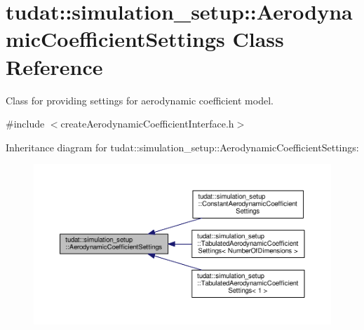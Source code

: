 \hypertarget{classtudat_1_1simulation__setup_1_1AerodynamicCoefficientSettings}{}\section{tudat\+:\+:simulation\+\_\+setup\+:\+:Aerodynamic\+Coefficient\+Settings Class Reference}
\label{classtudat_1_1simulation__setup_1_1AerodynamicCoefficientSettings}


Class for providing settings for aerodynamic coefficient model.  




{\ttfamily \#include $<$create\+Aerodynamic\+Coefficient\+Interface.\+h$>$}



Inheritance diagram for tudat\+:\+:simulation\+\_\+setup\+:\+:Aerodynamic\+Coefficient\+Settings\+:
\nopagebreak
\begin{figure}[H]
\begin{center}
\leavevmode
\includegraphics[width=350pt]{classtudat_1_1simulation__setup_1_1AerodynamicCoefficientSettings__inherit__graph}
\end{center}
\end{figure}
